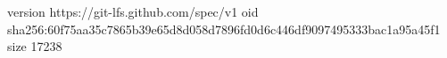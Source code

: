 version https://git-lfs.github.com/spec/v1
oid sha256:60f75aa35c7865b39e65d8d058d7896fd0d6c446df9097495333bac1a95a45f1
size 17238
